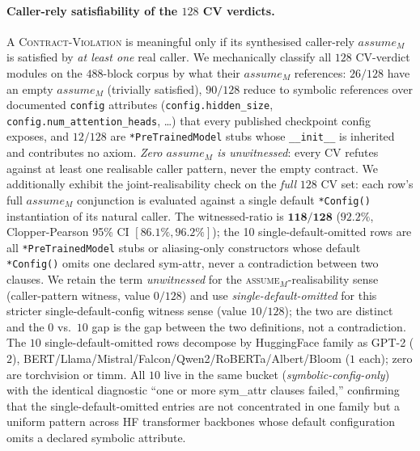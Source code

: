 \paragraph{Caller-rely satisfiability of the $128$ \textsc{CV} verdicts.}
A \textsc{Contract-Violation} is meaningful only if its synthesised
caller-rely $\mathit{assume}_M$ is satisfied by \emph{at least one}
real caller. We mechanically classify all $128$ CV-verdict modules
on the $488$-block corpus by what their $\mathit{assume}_M$
references: $26/128$ have an empty $\mathit{assume}_M$ (trivially
satisfied), $90/128$ reduce to symbolic references over documented
\texttt{config} attributes (\texttt{config.hidden\_size},
\texttt{config.num\_attention\_heads}, \dots) that every published
checkpoint config exposes, and $12/128$ are
\texttt{*PreTrainedModel} stubs whose \texttt{\_\_init\_\_} is
inherited and contributes no axiom. \emph{Zero $\mathit{assume}_M$ is
unwitnessed}: every CV refutes against at least one realisable
caller pattern, never the empty contract.
We additionally exhibit the joint-realisability check on the
\emph{full} $128$ CV set: each row's full $\mathit{assume}_M$
conjunction is evaluated against a single default
\texttt{*Config()} instantiation of its natural caller. The
witnessed-ratio is
$\mathbf{118/128}$ ($92.2\%$, Clopper-Pearson 95\% CI
$[\mathbf{86.1\%}, \mathbf{96.2\%}]$); the 10
single-default-omitted rows
are all \texttt{*PreTrainedModel} stubs or aliasing-only
constructors whose default \texttt{*Config()} omits one declared
sym-attr, never a contradiction between two clauses.
We retain the term \emph{unwitnessed} for the
\textsc{assume}$_M$-realisability sense (caller-pattern
witness, value $0/128$) and use \emph{single-default-omitted}
for this stricter single-default-config witness sense
(value $10/128$); the two are distinct and the $0$ vs.\ $10$
gap is the gap between the two definitions, not a
contradiction.
The $10$ single-default-omitted rows decompose by HuggingFace family as
GPT-2 ($2$), BERT/Llama/Mistral/Falcon/Qwen2/RoBERTa/Albert/Bloom
($1$ each); zero are torchvision or timm. All $10$ live in the
same bucket (\emph{symbolic-config-only}) with the identical
diagnostic ``one or more sym\_attr clauses failed,'' confirming
that the single-default-omitted entries are not concentrated in one family
but a uniform pattern across HF transformer backbones whose
default configuration omits a declared symbolic attribute.

